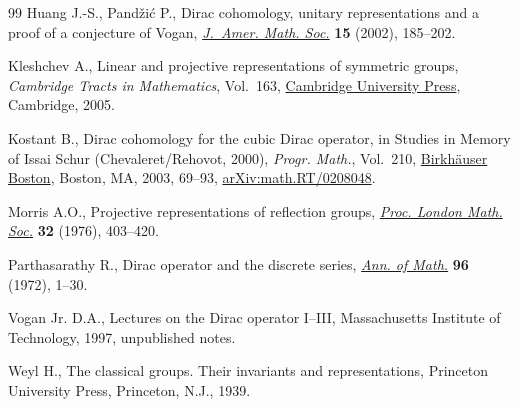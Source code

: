 \documentclass[10pt,a4paper]{amsart}
\numberwithin{equation}{section}
\begin{document}
\begin{thebibliography}{99}
Huang J.-S., Pand\v{z}i\'c P., Dirac cohomology, unitary representations and a
 proof of a conjecture of {V}ogan, \href{https://doi.org/10.1090/S0894-0347-01-00383-6}{\textit{J.~Amer. Math. Soc.}} \textbf{15}
 (2002), 185--202.

Kleshchev A., Linear and projective representations of symmetric groups,
 \textit{Cambridge Tracts in Mathematics}, Vol.~163, \href{https://doi.org/10.1017/CBO9780511542800}{Cambridge University
 Press}, Cambridge, 2005.

Kostant B., Dirac cohomology for the cubic {D}irac operator, in Studies in
 Memory of {I}ssai {S}chur ({C}hevaleret/{R}ehovot, 2000), \textit{Progr.
 Math.}, Vol.~210, \href{https://doi.org/10.1007/978-1-4612-0045-1_4}{Birkh\"auser Boston}, Boston, MA, 2003, 69--93,
 \href{https://arxiv.org/abs/math.RT/0208048}{arXiv:math.RT/0208048}.

Morris A.O., Projective representations of reflection groups, \href{https://doi.org/10.1112/plms/s3-32.3.403}{\textit{Proc.
 London Math. Soc.}} \textbf{32} (1976), 403--420.

Parthasarathy R., Dirac operator and the discrete series, \href{https://doi.org/10.2307/1970892}{\textit{Ann. of
 Math.}} \textbf{96} (1972), 1--30.

Vogan Jr. D.A., Lectures on the {D}irac operator {I}--{III}, {M}assachusetts
 Institute of Technology, 1997, unpublished notes.

Weyl H., The classical groups. {T}heir invariants and representations,
 Princeton University Press, Princeton, N.J., 1939.

\end{thebibliography}
\end{document}
